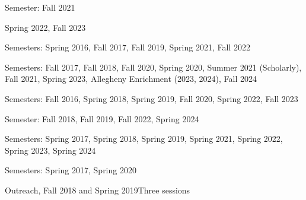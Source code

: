 \documentclass[11pt,a4paper]{moderncv}
\begin{document}
{Semester: Fall 2021}{}{}{}

{Spring 2022, Fall 2023}{}{}{}


{Semesters: Spring 2016, Fall 2017, Fall 2019, Spring 2021, Fall 2022}{}{}{}


{Semesters: Fall 2017, Fall 2018, Fall 2020, Spring 2020, Summer 2021 (Scholarly), Fall 2021, Spring 2023, Allegheny Enrichment (2023, 2024), Fall 2024}{}{}{}

{Semesters: Fall 2016, Spring 2018, Spring 2019, Fall 2020, Spring 2022, Fall 2023}{}{}{}


{Semester: Fall 2018, Fall 2019, Fall 2022, Spring 2024}{}{}{}


{Semesters: Spring 2017, Spring 2018, Spring 2019, Spring 2021, Spring 2022, Spring 2023, Spring 2024}{}{}{}


{Semesters: Spring 2017, Spring 2020}{}{}{}


{Outreach, Fall 2018 and Spring 2019}{Three sessions}{}{}
\end{document}

